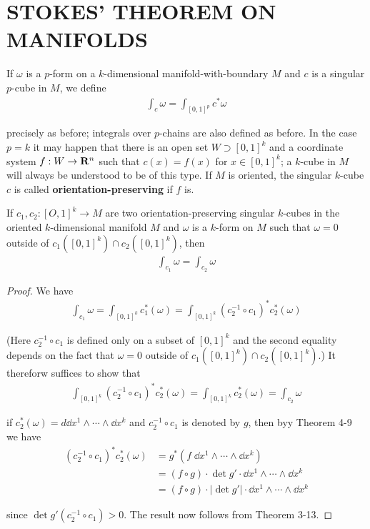 \clearpage
\section{STOKES' THEOREM ON MANIFOLDS}
If $\omega$ is a $p$-form on a $k$-dimensional manifold-with-boundary
$M$ and $c$ is a singular $p$-cube in $M$, we define
\begin{align*}
    \int_c \omega = \int_{[0,1]^p} c^*\omega
\end{align*}

precisely as before; integrals over $p$-chains are also defined as
before. In the case $p = k$ it may happen that there is an
open set $W\supset [0,1]^k$ and a coordinate system $f:W\to\mathbf{R}^n$ such
that $c(x) = f(x)$ for $x\in [0,1]^k$; a $k$-cube in $M$ will always be
understood to be of this type. If $M$ is oriented, the singular
$k$-cube $c$ is called \textbf{orientation-preserving} if $f$ is.

\begin{theorem}
    If $c_1,c_2: [O,1]^k\to M$ are two orientation-preserving singular $k$-cubes in the 
    oriented $k$-dimensional manifold $M$ and $\omega$ is a $k$-form on $M$ such 
    that $\omega= 0$ outside of $c_1([0,1]^k) \cap c_2([0,1]^k)$, then
    \begin{align*}
        \int_{c_1}\omega = \int_{c_2} \omega
    \end{align*}
\end{theorem}

\begin{proof}
    We have 
    \begin{align*}
        \int_{c_1}\omega 
        = \int_{[0,1]^k} c_1^*(\omega) 
        = \int_{[0,1]^k} (c_2^{-1}\circ c_1)^*c_2^*(\omega)
    \end{align*}

    (Here $c_2^{-1}\circ c_1$ is defined only on a subset of $[0,1]^k$ and the second equality depends on the 
    fact that $\omega=0$ outside of $c_1([0,1]^k)\cap c_2([0,1]^k)$.) It thereforw suffices to show that 
    \begin{align*}
        \int_{[0,1]^k}(c_2^{-1}\circ c_1)^*c_2^*(\omega)=\int_{[0,1]^k}c_2^*(\omega)=\int_{c_2}\omega
    \end{align*}

    if $c_2^*(\omega) =d\dd x^1\wedge\cdots\wedge\dd x^k$ and $c_2^{-1}\circ c_1$ is denoted 
    by $g$, then byy Theorem 4-9 we have 
    \begin{align*}
        (c_2^{-1}\circ c_1)^*c_2^*(\omega)
        & = g^*(f\;\dd x^1\wedge\cdots\wedge \dd x^k) \\
        & = (f\circ g)\cdot\det g'\cdot \dd x^1\wedge\cdots\wedge \dd x^k\\
        & = (f\circ g)\cdot\left|\det g'\right|\cdot \dd x^1\wedge\cdots\wedge \dd x^k
    \end{align*}

    since $\det g'(c_2^{-1}\circ c_1)>0$. The result now follows from Theorem 3-13.
\end{proof}

